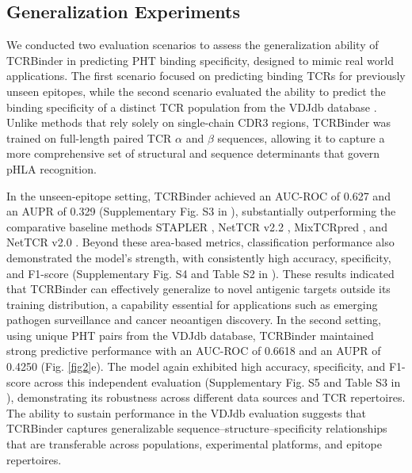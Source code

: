 \documentclass[10pt,letterpaper]{article}
\begin{document}
\subsection*{Generalization Experiments}

We conducted two evaluation scenarios to assess the generalization ability of TCRBinder in predicting PHT binding specificity, designed to mimic real world applications. The first scenario focused on predicting binding TCRs for previously unseen epitopes, while the second scenario evaluated the ability to predict the binding specificity of a distinct TCR population from the VDJdb database \cite{ref31}. Unlike methods that rely solely on single-chain CDR3 regions, TCRBinder was trained on full-length paired TCR $\alpha$ and $\beta$ sequences, allowing it to capture a more comprehensive set of structural and sequence determinants that govern pHLA recognition. 


In the unseen-epitope setting, TCRBinder achieved an AUC-ROC of 0.627 and an AUPR of 0.329 (Supplementary Fig. S3 in ), substantially outperforming the comparative baseline methods STAPLER \cite{ref37}, NetTCR v2.2 \cite{ref38}, MixTCRpred \cite{ref39},  and NetTCR v2.0 \cite{ref40}. Beyond these area-based metrics, classification performance also demonstrated the model’s strength, with consistently high accuracy, specificity, and F1-score (Supplementary Fig. S4 and Table S2 in ). These results indicated that TCRBinder can effectively generalize to novel antigenic targets outside its training distribution, a capability essential for applications such as emerging pathogen surveillance and cancer neoantigen discovery. In the second setting, using unique PHT pairs from the VDJdb database, TCRBinder maintained strong predictive performance with an AUC-ROC of 0.6618 and an AUPR of 0.4250 (Fig. \ref{fig2}e). The model again exhibited high accuracy, specificity, and F1-score across this independent evaluation (Supplementary Fig. S5 and Table S3 in ), demonstrating its robustness across different data sources and TCR repertoires. The ability to sustain performance in the VDJdb evaluation suggests that TCRBinder captures generalizable sequence–structure–specificity relationships that are transferable across populations, experimental platforms, and epitope repertoires.
\end{document}
